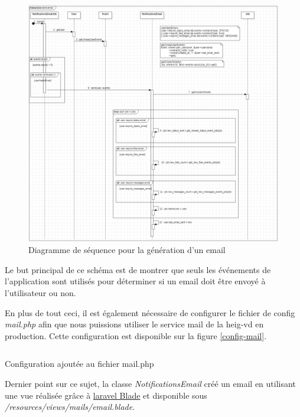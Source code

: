 \documentclass[
    iai, %
    il, %
]{heig-tb}
\begin{document}
\begin{center}
    \begin{figure}[H]
        \includegraphics[width=\textwidth]{./assets/figures/emails-events-sequence.png}
        \caption{Diagramme de séquence pour la génération d'un email \label{events-email-sequence}}
    \end{figure}
\end{center}

Le but principal de ce schéma est de montrer que seuls les événements de l'application sont utilisés pour déterminer si un email doit être envoyé à l'utilisateur ou non.

En plus de tout ceci, il est également nécessaire de configurer le fichier de config \emph{mail.php} afin que nous puissions utiliser le service mail de la \Gls{heig-vd} en production. Cette configuration est disponible sur la figure \ref{config-mail}.

\begin{listing}[H]
    \inputminted{php}{assets/code/mail.php}
    \caption{Configuration ajoutée au fichier mail.php \label{config-mail}}
\end{listing}

Dernier point sur ce sujet, la classe \emph{NotificationsEmail} créé un email en utilisant une vue réalisée grâce à \href{https://laravel.com/docs/9.x/blade}{\Gls{laravel} Blade} et disponible sous \emph{/resources/views/mails/email.blade}.
\end{document}
